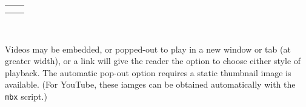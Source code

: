 \documentclass[10pt,]{article}
\theoremstyle{plain}
\theoremstyle{definition}
\theoremstyle{definition}
\theoremstyle{definition}
\theoremstyle{definition}
\theoremstyle{definition}
\theoremstyle{definition}
\numberwithin{equation}{section}
\newlength{\panelmax}
\begin{document}
{%
\setlength{\panelmax}{0pt}
\ifdefined\panelboxAvideo\else\newsavebox{\panelboxAvideo}\fi%
\ifdefined\phAvideo\else\newlength{\phAvideo}\fi%
\setlength{\phAvideo}{\ht\panelboxAvideo+\dp\panelboxAvideo}
\settototalheight{\phAvideo}{\usebox{\panelboxAvideo}}
\setlength{\panelmax}{\maxof{\panelmax}{\phAvideo}}
\ifdefined\panelboxBvideo\else\newsavebox{\panelboxBvideo}\fi%
\savebox{\panelboxBvideo}{%
\parbox{70pt}{[video]}}
\ifdefined\phBvideo\else\newlength{\phBvideo}\fi%
\setlength{\phBvideo}{\ht\panelboxBvideo+\dp\panelboxBvideo}
\settototalheight{\phBvideo}{\usebox{\panelboxBvideo}}
\setlength{\panelmax}{\maxof{\panelmax}{\phBvideo}}
\leavevmode%
\setlength{\tabcolsep}{0.05\linewidth}
\par\medskip\noindent
\hspace*{0.1\linewidth}%
\begin{tabular}{@{}*{2}{c}@{}}
\begin{minipage}[c][\panelmax][t]{0.35\linewidth}\usebox{\panelboxAvideo}\end{minipage}&
\begin{minipage}[c][\panelmax][t]{0.35\linewidth}\usebox{\panelboxBvideo}\end{minipage}\tabularnewline
\parbox[t]{0.35\linewidth}{
}&
\parbox[t]{0.35\linewidth}{
}\end{tabular}\\
}%
\par
\hypertarget{p-501}{}%
Videos may be embedded, or popped-out to play in a new window or tab (at greater width), or a link will give the reader the option to choose either style of playback.  The automatic pop-out option requires a static thumbnail image is available.  (For YouTube, these iamges can be obtained automatically with the \lstinline?mbx? script.)%
\end{document}
